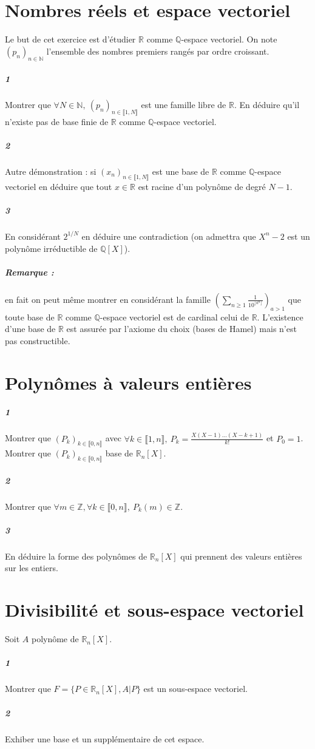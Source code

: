 \documentclass[10pt,a4paper]{article}
\begin{document}
\section{Nombres réels et espace vectoriel}
Le but de cet exercice est d'étudier $\mathbb{R}$ comme $\mathbb{Q}$-espace vectoriel. On note $(p_n)_{n \in \mathbb{N}}$ l'ensemble des nombres premiers rangés par ordre croissant.
\subparagraph{1} Montrer que $\forall N \in \mathbb{N}, \ (p_n)_{n \in \llbracket 1,N \rrbracket}$ est une famille libre de $\mathbb{R}$. En déduire qu'il n'existe pas de base finie de $\mathbb{R}$ comme $\mathbb{Q}$-espace vectoriel.
\subparagraph{2} Autre démonstration : si $(x_n)_{n \in \llbracket 1,N \rrbracket}$ est une base de $\mathbb{R}$ comme $\mathbb{Q}$-espace vectoriel en déduire que tout $x\in \mathbb{R}$ est racine d'un polynôme de degré $N-1$.
\subparagraph{3}En considérant $2^{1/N}$ en déduire une contradiction (on admettra que $X^n-2$ est un polynôme irréductible de $\mathbb{Q}[X]$).

\subparagraph{Remarque :} en fait on peut même montrer en considérant la famille $(\underset{n \ge 1}{\sum} \frac{1}{10^{\lfloor a^n \rfloor}})_{a>1}$ que toute base de $\mathbb{R}$ comme $\mathbb{Q}$-espace vectoriel est de cardinal celui de $\mathbb{R}$. L'existence d'une base de $\mathbb{R}$ est assurée par l'axiome du choix (bases de Hamel) mais n'est pas constructible.

\section{Polynômes à valeurs entières}
\subparagraph{1}Montrer que $(P_k)_{k \in \llbracket 0,n\rrbracket}$ avec $\forall k \in \llbracket 1,n \rrbracket, \ P_k = \frac{X (X-1) \dots (X-k+1)}{k !}$ et $P_0=1$. Montrer que $(P_k)_{k \in \llbracket 0,n\rrbracket}$ base de $\mathbb{R}_n[X]$.
\subparagraph{2}Montrer que $\forall m \in \mathbb{Z}, \forall k \in \llbracket 0,n\rrbracket, \ P_k(m) \in \mathbb{Z}$.
\subparagraph{3}En déduire la forme des polynômes de $\mathbb{R}_n[X]$ qui prennent des valeurs entières sur les entiers.

\section{Divisibilité et sous-espace vectoriel}
Soit $A$ polynôme de $\mathbb{R}_n[X]$.
\subparagraph{1}Montrer que $F=\lbrace P \in \mathbb{R}_n[X], A \vert P \rbrace$ est un sous-espace vectoriel.
\subparagraph{2}Exhiber une base et un supplémentaire de cet espace.
\end{document}

